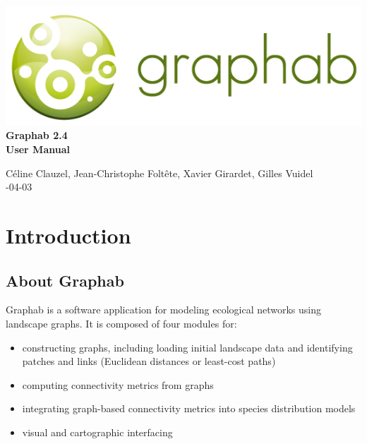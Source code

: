 \documentclass{article}
\begin{document}
\begin{titlepage}

	\centering
	\includegraphics[scale=0.5]{img/logo.png}\\
	
	\bigskip
	\bigskip
	\bigskip	
	{\Huge
	\bfseries
	Graphab 2.4\\
	\bigskip
	User Manual\\
	}
	\bigskip
	\bigskip
	\bigskip
	\bigskip
	\bigskip
			
	{\Large		
	Céline Clauzel, Jean-Christophe Foltête, Xavier Girardet, Gilles Vuidel\\
	-04-03\\
	}
	
\end{titlepage}

\setcounter{tocdepth}{2}
\tableofcontents

\pagebreak

\section{Introduction}

\subsection{About Graphab}

Graphab is a software application for modeling ecological networks using landscape graphs. It is composed of four modules for:
\begin{itemize}
	\item constructing graphs, including loading initial landscape data and identifying patches and links (Euclidean distances or least-cost paths)
	\item computing connectivity metrics from graphs
	\item integrating graph-based connectivity metrics into species distribution models
	\item visual and cartographic interfacing 
\end{itemize}
\end{document}
